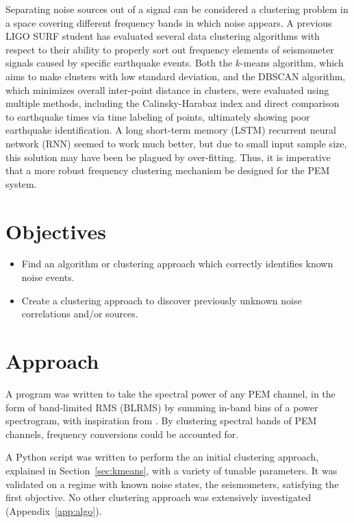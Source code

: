\documentclass[colorlinks=true,pdfstartview=FitV,linkcolor=blue,
            citecolor=red,urlcolor=magenta]{ligodoc}
\begin{document}
Separating noise sources out of a signal can be considered a clustering problem in a space covering different frequency bands in which noise appears.
A previous LIGO SURF student has evaluated several data clustering algorithms with respect to their ability to properly sort out frequency elements of seismometer signals caused by specific earthquake events\cite{roxana}.
Both the $k$-means algorithm, which aims to make clusters with low standard deviation, and the DBSCAN algorithm, which minimizes overall inter-point distance in clusters, were evaluated using multiple methods, including the Calinsky-Harabaz  index and direct comparison to earthquake times via time labeling of points, ultimately showing poor earthquake identification.
A long short-term memory (LSTM) recurrent neural network (RNN) seemed to work much better, but due to small input sample size, this solution may have been be plagued by over-fitting.
Thus, it is imperative that a more robust frequency clustering mechanism be designed for the PEM system.

\section{Objectives}
\begin{itemize}
\item
  Find an algorithm or clustering approach which correctly identifies known noise events.
\item
  Create a clustering approach to discover previously unknown noise correlations and/or sources.
\end{itemize}

\section{Approach}

A program was written to take the spectral power of any PEM channel, in the form of band-limited RMS (BLRMS) by summing in-band bins of a power spectrogram, with inspiration from \cite{vajente}. By clustering spectral bands of PEM channels, frequency conversions could be accounted for.

A Python script was written to perform the an initial clustering approach, explained in Section~\ref{sec:kmeans}, with a variety of tunable parameters. It was validated on a regime with known noise states, the seismometers, satisfying the first objective. No other clustering approach was extensively investigated (Appendix~\ref{app:algo}).
\end{document}
